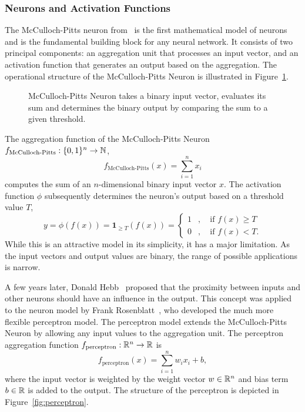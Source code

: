 \subsubsection{Neurons and Activation Functions}
The McCulloch-Pitts neuron from~\cite{mcculloch} is the first mathematical model of neurons and is the fundamental building block for any neural network.
It consists of two principal components: an aggregation unit that processes an input vector, and an activation function that generates an output based on the aggregation.
The operational structure of the McCulloch-Pitts Neuron is illustrated in Figure~\ref{fig:mccullochpittsneuron}.
\begin{figure}[H]
    \centering
    
    \caption{\label{fig:mccullochpittsneuron}McCulloch-Pitts Neuron takes a binary input vector, evaluates its sum and determines the binary output by comparing the sum to a given threshold.}
\end{figure}
The aggregation function of the McCulloch-Pitts Neuron $f_{\text{McCulloch-Pitts}} : \{0, 1\}^n \rightarrow \mathbb{N}$,
\begin{equation*}
    f_{\text{McCulloch-Pitts}}(x) = \sum_{i=1}^{n} x_{i}
\end{equation*}
computes the sum of an $n$-dimensional binary input vector $x$.
The activation function $\phi$ subsequently determines the neuron's output based on a threshold value $T$,
\begin{equation*}
    y = \phi(f(x))  = \mathbf{1}_{\geq T} (f(x)) = \begin{cases} 1&, \quad \text{if } f(x) \geq T\\ 0&, \quad \text{if } f(x) < T. \end{cases}
\end{equation*}
While this is an attractive model in its simplicity, it has a major limitation.
As the input vectors and output values are binary, the range of possible applications is narrow.

A few years later, Donald Hebb~\cite{hebb} proposed that the proximity between inputs and other neurons should have an influence in the output.
This concept was applied to the neuron model by Frank Rosenblatt~\cite{rosenblatt}, who developed the much more flexible perceptron model.
The perceptron model extends the McCulloch-Pitts Neuron by allowing any input values to the aggregation unit.
The perceptron aggregation function $f_{\text{perceptron}} : \mathbb{R}^n \rightarrow \mathbb{R}$ is
\begin{equation*}
    f_{\text{perceptron}}(x) = \sum_{i=1}^{n} w_{i} x_{i} + b,
\end{equation*}
where the input vector is weighted by the weight vector $w \in \mathbb{R}^n$ and bias term $b \in \mathbb{R}$ is added to the output. 
The structure of the perceptron is depicted in Figure~\ref{fig:perceptron}.

